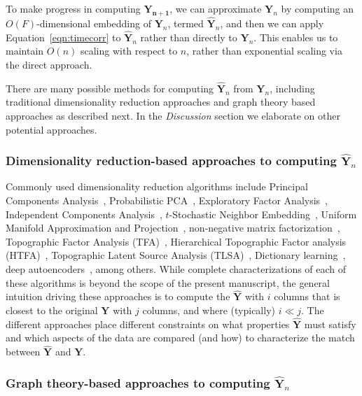 \documentclass[english]{article}
\begin{document}
To make progress in computing $\mathbf{Y_{n+1}}$, we can approximate
$\mathbf{Y}_n$ by computing an $O(F)$-dimensional embedding of
$\mathbf{Y}_n$, termed $\hat{\mathbf{Y}}_n$, and then we can apply
Equation~\ref{eqn:timecorr} to $\hat{\mathbf{Y}}_n$ rather than
directly to $\mathbf{Y}_n$.  This enables us to maintain $O(n)$
scaling with respect to $n$, rather than exponential scaling via the
direct approach.

There are many possible methods for computing $\hat{\mathbf{Y}}_n$
from $\mathbf{Y}_n$, including traditional dimensionality reduction
approaches and graph theory based approaches as described next.  In the
\textit{Discussion} section we elaborate on other potential approaches.

\subsubsection*{Dimensionality reduction-based approaches to computing
  $\hat{\mathbf{Y}}_n$}

Commonly used dimensionality reduction algorithms include Principal
Components Analysis~\citep[PCA; ][]{Pear01}, Probabilistic
PCA~\citep[PPCA; ][]{TippBish99}, Exploratory Factor
Analysis~\citep[EFA; ][]{Spea04}, Independent Components
Analysis~\citep[ICA; ][]{JuttHera91, ComoEtal91}, $t$-Stochastic
Neighbor Embedding~\citep[$t$-SNE; ][]{MaatHint08}, Uniform Manifold
Approximation and Projection~\citep[UMAP; ][]{McInHeal18},
non-negative matrix factorization~\citep[NMF; ][]{LeeSeun99},
Topographic Factor Analysis (TFA)~\cite{MannEtal14b}, Hierarchical
Topographic Factor analysis (HTFA)~\cite{MannEtal18}, Topographic
Latent Source Analysis (TLSA)~\cite{GersEtal11}, Dictionary
learning~\citep{MairEtal09a, MairEtal09b}, deep
autoencoders~\citep{HintSala06}, among others.  While complete
characterizations of each of these algorithms is beyond the scope of
the present manuscript, the general intuition driving these
approaches is to compute the $\hat{\mathbf{Y}}$ with $i$ columns that
is closest to the original $\mathbf{Y}$ with $j$ columns, and where
(typically) $i \ll j$.  The different approaches place different
constraints on what properties $\hat{\mathbf{Y}}$ must satisfy and
which aspects of the data are compared (and how) to characterize the
match between $\hat{\mathbf{Y}}$ and  $\mathbf{Y}$.

\subsubsection*{Graph theory-based approaches to computing
  $\hat{\mathbf{Y}}_n$}
\end{document}
